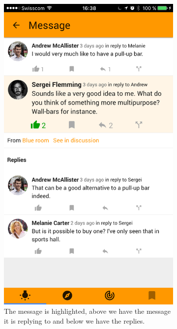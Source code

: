 \documentclass[a4paper,12pt, oneside]{article}
\begin{document}
\begin{figure}[!htb]
    \null\hfill
    \begin{subfigure}[t]{.32\textwidth}
        \centering
        \includegraphics[width=\textwidth]{images/messageView.png}
        \caption{The message is highlighted, above we have the message it is replying to and below we have the replies.}
        \label{fig.messageView}
    \end{subfigure}
    \hfill
    \begin{subfigure}[t]{.32\textwidth}

\end{subfigure}
\end{figure}
\end{document}
